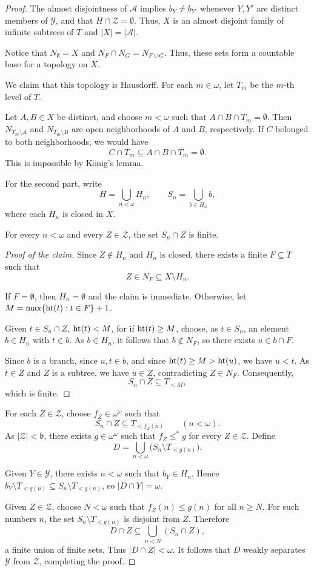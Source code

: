 \begin{proof}
The almost disjointness of $\mathcal A$ implies $b_Y\neq b_{Y'}$ whenever $Y, Y'$ are distinct members of $\mathcal Y$, and that $H\cap \mathcal Z=\emptyset$.
Thus, $X$ is an almost disjoint
family of infinite subtrees of $T$ and $|X|=|\mathcal A|$.

Notice that
$N_\emptyset=X$ and $N_F\cap N_G=N_{F\cup G}$.
Thus, these sets form a countable base for a topology on $X$.

We claim that this topology is Hausdorff.
For each $m \in \omega$, let $T_m$ be the $m$-th level of $T$.

Let $A,B\in X$ be distinct, and choose $m<\omega$ such that
$A\cap B\cap T_m=\emptyset$.
Then $N_{T_m\setminus A}$ and $N_{T_m\setminus B}$ are open
neighborhoods of $A$ and $B$, respectively.
If $C$ belonged to both neighborhoods, we would have
\[
  C\cap T_m\subseteq A\cap B\cap T_m=\emptyset.
\]
This is impossible by König's lemma.

For the second part, write
\[
  H=\bigcup_{n<\omega}H_n,\qquad S_n=\bigcup_{b\in H_n}b,
\]
where each $H_n$ is closed in $X$.
\begin{claim}
  For every $n<\omega$ and every $Z\in\mathcal Z$, the set $S_n\cap Z$ is finite.
\end{claim}
\begin{proof}[Proof of the claim]
Since $Z\notin H_n$ and $H_n$ is closed, there exists a finite $F\subseteq T$ such that
\[
  Z\in N_F\subseteq X\setminus H_n.
\]

If $F=\emptyset$, then $H_n=\emptyset$ and the claim is immediate.
Otherwise, let $M=\max\{\operatorname{ht}(t):t\in F\}+1$.

Given $t\in S_n\cap Z$, $\operatorname{ht}(t)<M$, for if $\operatorname{ht}(t)\geq M$, choose, as $t\in S_n$, an element $b\in H_n$
with $t\in b$.
As $b \in H_n$, it follows that $b\notin N_F$, so there exists $u\in b\cap F$.

Since $b$ is a branch, since $u, t\in b$, and since $\operatorname{ht}(t)\geq M>\operatorname{ht}(u)$, we have $u<t$.
As $t\in Z$ and $Z$ is a subtree, we have $u\in Z$, contradicting $Z\in N_F$.
Consequently,
\[
  S_n\cap Z\subseteq T_{<M},
\]
which is finite.
\end{proof}

For each $Z\in\mathcal Z$, choose $f_Z\in\omega^\omega$ such that
\[
  S_n\cap Z\subseteq T_{<f_Z(n)}
  \qquad(n<\omega).
\]
As $|\mathcal Z|<\mathfrak b$, there exists
$g\in\omega^\omega$ such that $f_Z\leq^*g$ for every
$Z\in\mathcal Z$. Define
\[
  D=\bigcup_{n<\omega}\bigl(S_n\setminus T_{<g(n)}\bigr).
\]

Given $Y\in\mathcal Y$, there exists $n<\omega$ such that $b_Y\in H_n$.
Hence $b_Y\setminus T_{<g(n)}\subseteq S_n\setminus T_{<g(n)}$, so $|D\cap Y|=\omega$.

Given $Z\in\mathcal Z$, choose $N<\omega$ such that
$f_Z(n)\leq g(n)$ for all $n\geq N$.
For such numbers $n$, the set $S_n\setminus T_{<g(n)}$ is disjoint from $Z$.
Therefore
\[
  D\cap Z\subseteq\bigcup_{n<N}(S_n\cap Z),
\]
a finite union of finite sets. Thus $|D\cap Z|<\omega$.
It follows that $D$ weakly separates $\mathcal Y$ from $\mathcal Z$, completing the proof.
\end{proof}

